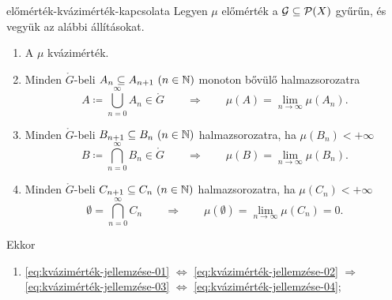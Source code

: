 \documentclass[
]{elteikthesis}[2024/04/26]
\begin{document}
	\begin{theorem}{}{előmérték-kvázimérték-kapcsolata}
		Legyen \( \mu \) előmérték a \( \mathcal{G} \subseteq \mathcal{P}( X ) \) gyűrűn,
		és vegyük az alábbi állításokat.
		\begin{enumerate}[label=\alph*)]
			\item\label{eq:kvázimérték-jellemzése-01} A \( \mu \) kvázimérték.
			
			\item\label{eq:kvázimérték-jellemzése-02}
			Minden \( \ring{G} \)-beli \( A_n \subseteq A_{n + 1} \ (n \in \mathbb{N}) \) 
			monoton bővülő halmazsorozatra
			\[
				A \coloneq \bigcup_{n=0}^{\infty} A_n \in \ring{G}
				\qquad \Longrightarrow \qquad
				\mu(A) = \lim_{n \to \infty} \mu(A_n).
			\]
			
			\item\label{eq:kvázimérték-jellemzése-03}
			Minden \( \ring{G} \)-beli \( B_{n + 1} \subseteq B_n \ (n \in \mathbb{N}) \)
			halmazsorozatra, ha \( \mu(B_n) < +\infty \)
			\[
				B \coloneq \bigcap_{n=0}^{\infty} B_n \in \ring{G}
				\qquad \Longrightarrow \qquad
				\mu(B) = \lim_{n \to \infty} \mu(B_n).
			\]
			
			\item{}\label{eq:kvázimérték-jellemzése-04} 
			Minden \( \ring{G} \)-beli \( C_{n + 1} \subseteq C_n \ (n \in \mathbb{N}) \)
			halmazsorozatra, ha \( \mu(C_n) < +\infty \)
			\[
				\emptyset = \bigcap_{n=0}^{\infty} C_n
				\qquad \Longrightarrow \qquad
				\mu(\emptyset) = \lim_{n \to \infty} \mu(C_n) = 0.
			\]
		\end{enumerate}
		Ekkor
		\begin{enumerate}
			\item 
			\ref{eq:kvázimérték-jellemzése-01} \( \Longleftrightarrow \)
			\ref{eq:kvázimérték-jellemzése-02} \( \Longrightarrow \)
			\ref{eq:kvázimérték-jellemzése-03} \( \Longleftrightarrow \)
			\ref{eq:kvázimérték-jellemzése-04};
			

\end{enumerate}
\end{theorem}
\end{document}
